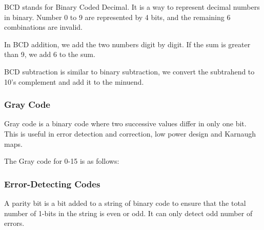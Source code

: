 \documentclass[a4paper,12pt]{article}
\begin{document}
BCD stands for Binary Coded Decimal.
It is a way to represent decimal numbers in binary.
Number 0 to 9 are represented by 4 bits, and the remaining 6 combinations are invalid.

In BCD addition, we add the two numbers digit by digit.
If the sum is greater than 9, we add 6 to the sum.

BCD subtraction is similar to binary subtraction, we convert the subtrahend to 10's complement and add it to the minuend.

\subsubsection{Gray Code}

Gray code is a binary code where two successive values differ in only one bit.
This is useful in error detection and correction, low power design and Karnaugh maps.

The Gray code for 0-15 is as follows:
\begin{center}
\end{center}
\subsubsection{Error-Detecting Codes}

A parity bit is a bit added to a string of binary code to ensure that the total number of 1-bits in the string is even or odd.
It can only detect odd number of errors.
\end{document}
